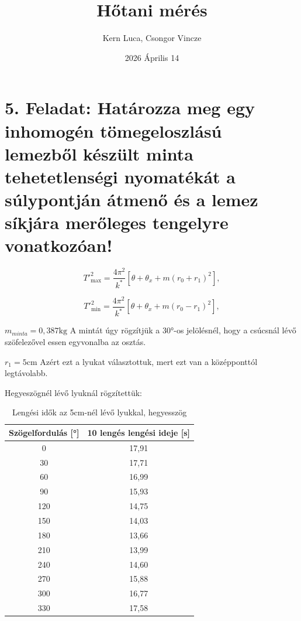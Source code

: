 \documentclass{article}
\title{Hőtani mérés}
\author{Kern Luca, Csongor Vincze}
\date{2026 Április 14}
\begin{document}
\maketitle

\section*{5. Feladat: Határozza meg egy inhomogén tömegeloszlású lemezből készült minta tehetetlenségi nyomatékát a súlypontján átmenő és a lemez síkjára merőleges tengelyre vonatkozóan!}

\[
T'^2_{\max} = \frac{4\pi^2}{k^*} \left[ \theta + \theta_x + m(r_0 + r_1)^2 \right],
\]

\[
T'^2_{\min} = \frac{4\pi^2}{k^*} \left[ \theta + \theta_x + m(r_0 - r_1)^2 \right],
\]


$m_{minta}= 0,387 \text{kg}$
A mintát úgy rögzítjük a 30°-os jelölésnél, hogy a csúcsnál lévő szöfelezővel essen egyvonalba az osztás.

$r_{1}= 5 \text{cm}$
Azért ezt a lyukat választottuk, mert ezt van a középponttól legtávolabb.

Hegyeszögnél lévő lyuknál rögzítettük:

\begin{table}[H]
    \centering
    \begin{tabular}{|c|c|}
        \hline
        Szögelfordulás [°] & 10 lengés lengési ideje [s] \\ \hline
         0 & 17,91 \\ \hline 
         30 & 17,71 \\ \hline
         60 & 16,99 \\ \hline 
         90 & 15,93 \\ \hline
         120 & 14,75 \\ \hline 
         150 & 14,03 \\ \hline
         180 & 13,66 \\ \hline
         210 & 13,99 \\ \hline
         240 & 14,60 \\ \hline
         270 & 15,88 \\ \hline
         300 & 16,77 \\ \hline
         330 & 17,58\\ \hline
        
    \end{tabular}
    \caption{Lengési idők az 5cm-nél lévő lyukkal, hegyesszög}
    \label{tab:lengesiido_1.1}
\end{table}
\end{document}
